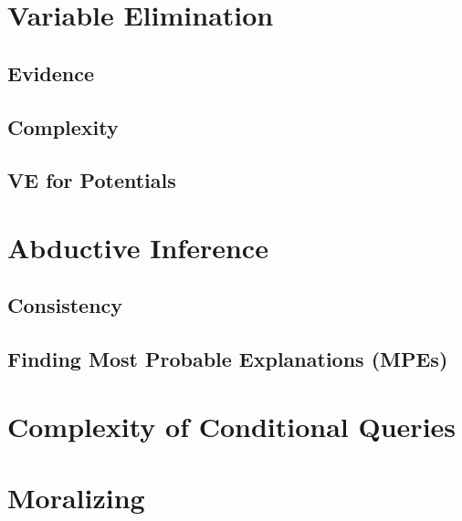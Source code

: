     \section{Variable Elimination} %

        \subsection{Evidence} %

        \subsection{Complexity} %

        \subsection{VE for Potentials} %

    \section{Abductive Inference} %

        \subsection{Consistency} %

        \subsection{Finding Most Probable Explanations (MPEs)} %

    \section{Complexity of Conditional Queries} %

    \section{Moralizing} %

